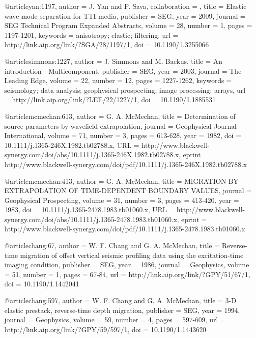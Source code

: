 @article{yan:1197,
author = {J. Yan and P. Sava},
collaboration = {},
title = {Elastic wave mode separation for {TTI} media},
publisher = {SEG},
year = {2009},
journal = {SEG Technical Program Expanded Abstracts},
volume = {28},
number = {1},
pages = {1197-1201},
keywords = {anisotropy; elastic; filtering},
url = {http://link.aip.org/link/?SGA/28/1197/1},
doi = {10.1190/1.3255066}
}






@article{simmons:1227,
  author =	 {J. Simmons and M. Backus},
  title =	 {An introduction---{M}ulticomponent},
  publisher =	 {SEG},
  year =	 2003,
  journal =	 {The Leading Edge},
  volume =	 22,
  number =	 12,
  pages =	 {1227-1262},
  keywords =	 {seismology; data analysis; geophysical prospecting;
                  image processing; arrays},
  url =		 {http://link.aip.org/link/?LEE/22/1227/1},
  doi =		 {10.1190/1.1885531}
}

@article{mcmechan:613,
  author =	 {G. A. McMechan},
  title =	 {Determination of source parameters by wavefield
                  extrapolation},
  journal =	 {Geophysical Journal International},
  volume =	 71,
  number =	 3,
  pages =	 {613-628},
  year =	 1982,
  doi =		 {10.1111/j.1365-246X.1982.tb02788.x},
  URL =
                  {http://www.blackwell-synergy.com/doi/abs/10.1111/j.1365-246X.1982.tb02788.x},
  eprint =
                  {http://www.blackwell-synergy.com/doi/pdf/10.1111/j.1365-246X.1982.tb02788.x}
}

@article{mcmechan:413,
  author =	 {G. A. McMechan},
  title =	 {MIGRATION BY EXTRAPOLATION OF TIME-DEPENDENT
                  BOUNDARY VALUES},
  journal =	 {Geophysical Prospecting},
  volume =	 31,
  number =	 3,
  pages =	 {413-420},
  year =	 1983,
  doi =		 {10.1111/j.1365-2478.1983.tb01060.x},
  URL =
                  {http://www.blackwell-synergy.com/doi/abs/10.1111/j.1365-2478.1983.tb01060.x},
  eprint =
                  {http://www.blackwell-synergy.com/doi/pdf/10.1111/j.1365-2478.1983.tb01060.x}
}

@article{chang:67,
  author =	 {W. F. Chang and G. A. McMechan},
  title =	 {Reverse-time migration of offset vertical seismic
                  profiling data using the excitation-time imaging
                  condition},
  publisher =	 {SEG},
  year =	 1986,
  journal =	 {Geophysics},
  volume =	 51,
  number =	 1,
  pages =	 {67-84},
  url =		 {http://link.aip.org/link/?GPY/51/67/1},
  doi =		 {10.1190/1.1442041}
}

@article{chang:597,
  author =	 {W. F. Chang and G. A. McMechan},
  title =	 {3-{D} elastic prestack, reverse-time depth
                  migration},
  publisher =	 {SEG},
  year =	 1994,
  journal =	 {Geophysics},
  volume =	 59,
  number =	 4,
  pages =	 {597-609},
  url =		 {http://link.aip.org/link/?GPY/59/597/1},
  doi =		 {10.1190/1.1443620}
}

